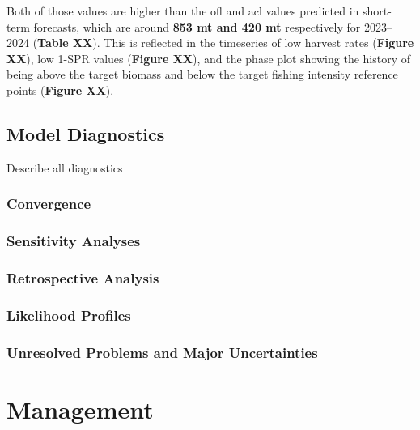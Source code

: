 \documentclass[11pt,
  english,
  letterpaper,
]{article}
\begin{document}
Both of those values are higher than the \gls{ofl} and \gls{acl} values predicted in short-term forecasts, which are around \textbf{853 mt and 420 mt} respectively for 2023--2024 (\textbf{Table XX}). This is reflected in the timeseries of low harvest rates (\textbf{Figure XX}), low 1-SPR values (\textbf{Figure XX}), and the phase plot showing the history of being above the target biomass and below the target fishing intensity reference points (\textbf{Figure XX}).

\hypertarget{model-diagnostics}{%
\subsection{Model Diagnostics}\label{model-diagnostics}}

Describe all diagnostics

\hypertarget{convergence}{%
\subsubsection{Convergence}\label{convergence}}

\hypertarget{sensitivity-analyses}{%
\subsubsection{Sensitivity Analyses}\label{sensitivity-analyses}}

\hypertarget{retrospective-analysis}{%
\subsubsection{Retrospective Analysis}\label{retrospective-analysis}}

\hypertarget{likelihood-profiles}{%
\subsubsection{Likelihood Profiles}\label{likelihood-profiles}}

\hypertarget{unresolved-problems-and-major-uncertainties-1}{%
\subsubsection{Unresolved Problems and Major Uncertainties}\label{unresolved-problems-and-major-uncertainties-1}}

\hypertarget{management}{%
\section{Management}\label{management}}
\end{document}
